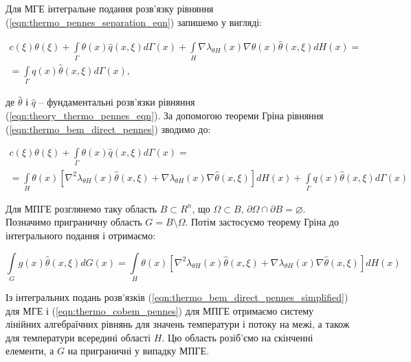 Для МГЕ інтегральне подання розв'язку рівняння (\ref{eqn:thermo_pennes_separation_eqn}) запишемо у вигляді: 

\begin{equation}
  \label{eqn:thermo_bem_direct_pennes}
  \begin{split}
  c(\xi)\theta(\xi) + \int \limits_{\Gamma}\theta(x)\hat{q}(x,\xi)d\Gamma(x)  
      + \int \limits_{H} \nabla{\lambda_{\theta H}(x)}\nabla{\theta(x)} \hat{\theta}(x,\xi) d H(x) = \\ 
      = \int \limits_{\Gamma}q(x)\hat{\theta}(x,\xi)d\Gamma(x),
  \end{split}
\end{equation}

\noindent де $\hat{\theta}$ і $\hat{q}$ -- фундаментальні розв'язки рівняння (\ref{eqn:theory_thermo_pennes_eqn}). За 
допомогою теореми Гріна рівняння (\ref{eqn:thermo_bem_direct_pennes}) зводимо до:

\begin{equation}
  \label{eqn:thermo_bem_direct_pennes_simplified}
  \begin{split}
    c(\xi)\theta(\xi) + \int \limits_{\Gamma}\theta(x)\hat{q}(x,\xi)d\Gamma(x) = \\
      = \int \limits_{H}\theta(x) [ \nabla^2 \lambda_{\theta H}(x) \hat{\theta}(x,\xi) + 
          \nabla \lambda_{\theta H}(x) \nabla \hat{\theta}(x,\xi) ] dH(x)
      + \int \limits_{\Gamma}q(x)\hat{\theta}(x,\xi)d\Gamma(x)
  \end{split}
\end{equation}

Для МПГЕ розглянемо таку область $B \subset R^n$, що $\Omega \subset B$, $\partial\Omega \cap \partial B = \varnothing$. 
Позначимо приграничну область $G = B \setminus \Omega$. Потім застосуємо теорему Гріна до інтегрального подання і
отримаємо: 

\begin{equation}
  \label{eqn:thermo_cobem_pennes}
    \int \limits_G g(x)\hat{\theta}(x,\xi)dG(x)
      = \int \limits_{H}\theta(x) [ \nabla^2 \lambda_{\theta H}(x) \hat{\theta}(x,\xi) + 
          \nabla \lambda_{\theta H}(x) \nabla \hat{\theta}(x,\xi) ] dH(x)
\end{equation}

Із інтегральних подань розв'язків (\ref{eqn:thermo_bem_direct_pennes_simplified}) для МГЕ і
(\ref{eqn:thermo_cobem_pennes}) для МПГЕ отримаємо систему лінійних алгебраїчних рівнянь для значень температури і
потоку на межі, а також для температури всередині області $H$. Цю область розіб'ємо на скінченні елементи, а $G$ на
приграничні у випадку МПГЕ.

